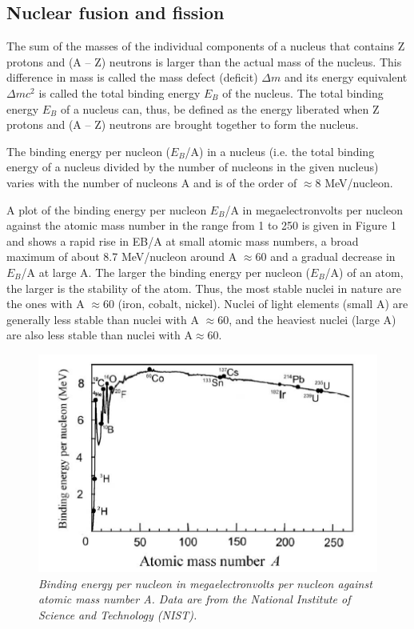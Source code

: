 \documentclass{article}
\begin{document}
\subsection*{Nuclear fusion and fission}
The sum of the masses of the individual components of a nucleus that contains Z protons and (A – Z) neutrons is larger than the actual mass of the nucleus. This difference in mass is called the mass defect (deficit) $\Delta m$ and its energy equivalent $\Delta mc^2$ is called the total binding energy $E_B$ of the nucleus. The total binding energy $E_B$ of a nucleus can, thus, be defined as the energy liberated when Z protons and (A – Z) neutrons are brought together to form the nucleus. 

The binding energy per nucleon ($E_B$/A) in a nucleus (i.e. the total binding energy of a nucleus divided by the number of nucleons in the given nucleus) varies with the number of nucleons A and is of the order of $\approx 8$ MeV/nucleon.

A plot of the binding energy per nucleon $E_B$/A in megaelectronvolts per
nucleon against the atomic mass number in the range from 1 to 250 is given in Figure 1 and shows a rapid rise in EB/A at small atomic mass numbers, a broad maximum of about 8.7 MeV/nucleon around A $\approx 60$ and a gradual decrease in $E_B$/A at large A. The larger the binding energy per nucleon ($E_B$/A) of an atom, the larger is the stability of the atom. Thus, the most stable nuclei in nature are the ones with A $\approx 60$ (iron, cobalt, nickel). Nuclei of light elements (small A) are generally less stable than nuclei with A $\approx 60$, and the heaviest nuclei (large A) are also less stable than nuclei with A$\approx 60$.

\begin{figure}[htp]
    \centering
    \includegraphics[width=12cm]{image}
    \caption{\textit{Binding energy per nucleon in megaelectronvolts per nucleon against atomic mass number A. Data are from the National Institute of Science and Technology (NIST).}}
\end{figure}
\end{document}

